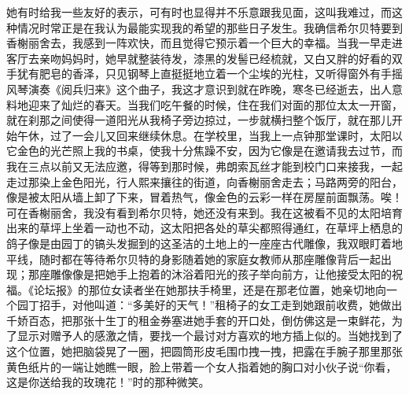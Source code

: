 \par 她有时给我一些友好的表示，可有时也显得并不乐意跟我见面，这叫我难过，而这种情况时常正是在我认为最能实现我的希望的那些日子发生。我确信希尔贝特要到香榭丽舍去，我感到一阵欢快，而且觉得它预示着一个巨大的幸福。当我一早走进客厅去亲吻妈妈时，她早就整装待发，漆黑的发髻已经梳就，又白又胖的好看的双手犹有肥皂的香泽，只见钢琴上直挺挺地立着一个尘埃的光柱，又听得窗外有手摇风琴演奏《阅兵归来》这个曲子，我这才意识到就在昨晚，寒冬已经逝去，出人意料地迎来了灿烂的春天。当我们吃午餐的时候，住在我们对面的那位太太一开窗，就在刹那之间使得一道阳光从我椅子旁边掠过，一步就横扫整个饭厅，就在那儿开始午休，过了一会儿又回来继续休息。在学校里，当我上一点钟那堂课时，太阳以它金色的光芒照上我的书桌，使我十分焦躁不安，因为它像是在邀请我去过节，而我在三点以前又无法应邀，得等到那时候，弗朗索瓦丝才能到校门口来接我，一起走过那染上金色阳光，行人熙来攘往的街道，向香榭丽舍走去；马路两旁的阳台，像是被太阳从墙上卸了下来，冒着热气，像金色的云彩一样在房屋前面飘荡。唉！可在香榭丽舍，我没有看到希尔贝特，她还没有来到。我在这被看不见的太阳培育出来的草坪上坐着一动也不动，这太阳把各处的草尖都照得通红，在草坪上栖息的鸽子像是由园丁的镐头发掘到的这圣洁的土地上的一座座古代雕像，我双眼盯着地平线，随时都在等待希尔贝特的身影随着她的家庭女教师从那座雕像背后一起出现；那座雕像像是把她手上抱着的沐浴着阳光的孩子举向前方，让他接受太阳的祝福。《论坛报》的那位女读者坐在她那扶手椅里，还是在那老位置，她亲切地向一个园丁招手，对他叫道：“多美好的天气！”租椅子的女工走到她跟前收费，她做出千娇百态，把那张十生丁的租金券塞进她手套的开口处，倒仿佛这是一束鲜花，为了显示对赠予人的感激之情，要找一个最讨对方喜欢的地方插上似的。当她找到了这个位置，她把脑袋晃了一圈，把圆筒形皮毛围巾拽一拽，把露在手腕子那里那张黄色纸片的一端让她瞧一眼，脸上带着一个女人指着她的胸口对小伙子说“你看，这是你送给我的玫瑰花！”时的那种微笑。
